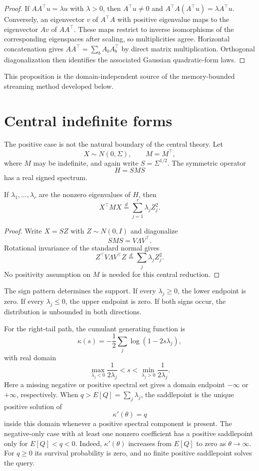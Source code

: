 \begin{proof}
If $AA^\top u=\lambda u$ with $\lambda>0$, then $A^\top u\ne0$ and
$A^\top A(A^\top u)=\lambda A^\top u$. Conversely, an eigenvector
$v$ of $A^\top A$ with positive eigenvalue maps to the eigenvector $Av$
of $AA^\top$. These maps restrict to inverse isomorphisms of the
corresponding eigenspaces after scaling, so multiplicities agree.
Horizontal concatenation gives $AA^\top=\sum_b A_bA_b^\top$ by direct
matrix multiplication. Orthogonal diagonalization then identifies the
associated Gaussian quadratic-form laws.
\end{proof}

This proposition is the domain-independent source of the memory-bounded
streaming method developed below.

\section{Central indefinite forms}

The positive case is not the natural boundary of the central theory.  Let
\[
X\sim N(0,\Sigma),
\qquad
M=M^\top,
\]
where $M$ may be indefinite, and again write $S=\Sigma^{1/2}$.  The symmetric
operator
\[
H=SMS
\]
has a real signed spectrum.

\begin{theorem}\label{claim:final-2-2}
If $\lambda_1,\ldots,\lambda_r$ are the nonzero eigenvalues of $H$, then
\[
\boxed{
X^\top M X
\overset d=
\sum_{j=1}^r\lambda_jZ_j^2.
}
\]
\end{theorem}

\begin{proof}
Write $X=SZ$ with $Z\sim N(0,I)$ and diagonalize
\[
SMS=V\Lambda V^\top.
\]
Rotational invariance of the standard normal gives
\[
Z^\top V\Lambda V^\top Z
\overset d=
\sum_j\lambda_jZ_j^2.
\]
No positivity assumption on $M$ is needed for this central reduction.
\end{proof}

The sign pattern determines the support.  If every $\lambda_j\ge0$, the lower
endpoint is zero.  If every $\lambda_j\le0$, the upper endpoint is zero.  If
both signs occur, the distribution is unbounded in both directions.

For the right-tail path, the cumulant generating function is
\[
\kappa(s)
=
-\frac12\sum_j\log(1-2s\lambda_j),
\]
with real domain
\[
\boxed{
\max_{\lambda_j<0}\frac{1}{2\lambda_j}
< s <
\min_{\lambda_j>0}\frac{1}{2\lambda_j}.
}
\]
Here a missing negative or positive spectral set gives a domain endpoint
\(-\infty\) or \(+\infty\), respectively.
When $q>E[Q]=\sum_j\lambda_j$, the saddlepoint is the unique positive solution
of
\[
\kappa'(\theta)=q
\]
inside this domain whenever a positive spectral component is present.  The
negative-only case with at least one nonzero coefficient has a positive
saddlepoint only for $E[Q]<q<0$. Indeed, $\kappa'(\theta)$ increases from
$E[Q]$ to zero as $\theta\to\infty$. For $q\ge0$ its survival
probability is zero, and no finite positive saddlepoint solves the query.

